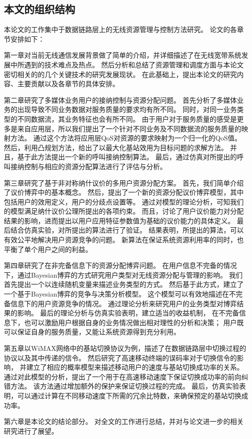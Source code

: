 \subsection{本文的组织结构}
本论文的工作集中于数据链路层上的无线资源管理与控制方法研究。
论文的各章节安排如下：

第一章对当前无线通信发展背景做了简单的介绍，并详细描述了在无线宽带系统发展中所遇到的技术难点及热点。
然后分析和总结了资源管理和调度方面与本论文密切相关的的几个关键技术的研究发展现状。
在此基础上，提出本论文的研究内容、主要贡献以及各章节的具体安排。
\par %

第二章研究了多媒体业务用户的接纳控制与资源分配问题。
首先分析了多媒体业务的出现导致不同业务数据对服务质量的要求均有所不同。
同时，对同一业务类型的不同数据流，其业务特征也会有所不同。
由于用户对于服务质量的感受是更多是来自应用层，所以我们提出了一个针对不同业务及不同数据流的服务质量的映射方法。
通过这个方法将应用层QoS对资源的要求映射为一个归一化的QoS值。
然后，利用凸规划方法，给出了以最大化基站效用为目标问题的求解方法。
并且，基于此方法提出一个新的呼叫接纳控制算法。
最后，通过仿真对所提出的呼叫接纳控制与相应的资源分配算法进行了评估与分析。


第三章研究了基于非对称纳什议价的多用户资源分配方案。
首先，我们简单介绍了议价博弈中的基本概念。
然后，提出了一个新的资源分配议价博弈模型，其中包括用户的效用定义，用户的分歧点设置等。
通过对模型的理论分析，可知我们的模型满足纳什议价公理所提出的各项约束。
而且，讨论了用户议价能力对分配结果的影响，进而提出以用户应用特征参数值为基础的议价能力的具体定义。
最后结合仿真实验，对所提出的算法进行了验证。
结果表明，所提出的算法，可以有效公平地解决用户资源竞争的问题。
新算法在保证系统资源利用率的同时，也平衡了单个用户之间的利益。


第四章研究了在非完备信息下的资源分配博弈问题。
在用户信息不完备的情况下，通过Bayesian博弈的方式研究用户类型对无线资源分配与管理的影响。
我们首先提出一个以连续随机变量来描述业务类型的方式。
然后基于此方式，建立了一个基于Bayesian博弈的竞争与决策分析模型。
这个模型可以有效地描述在不完备信息下的用户资源竞争的情况。
通过理论分析来研究用户的业务类型对博弈结果的影响。
最后的理论分析与仿真实验表明，建立适当的收益机制，
在不完备信息下，也可以激励用户根据自身的业务情况做出相对理性的分析和决策；
用户既可以保证自身的服务质量，又能让系统资源得到充分利用。

第五章以WiMAX网络中的基站切换协议为例，描述了在数据链路层中切换过程的协议以及其中传递的信令。
然后研究了高速移动终端的误码率对于切换信令的影响，
并建立了相应的概率模型来描述移动用户的速度与基站切换成功率的关系。
通过对此模型的分析，提出了一个用于在高速移动速度下保证切换成功率的前向纠错方法。
该方法通过增加额外的保护来保证切换过程的完成。
最后，仿真实验表明，可以通过计算在不同移动速度下所需的冗余比特数，来确保预定的基站切换成功率。

\par 第六章是本论文的结论部分。
对全文的工作进行总结，并对与论文进一步的相关研究进行了展望。
